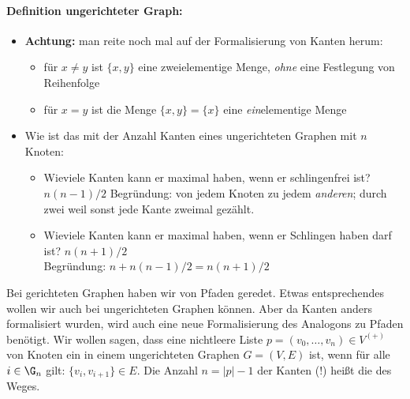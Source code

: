 \begin{tutorium} 
  \paragraph{Definition ungerichteter Graph:}
  \begin{itemize}
  \item \textbf{Achtung:} man reite noch mal auf der Formalisierung
von Kanten herum:
    \begin{itemize}
    \item für $x\not=y$ ist $\{x,y\}$ eine zweielementige Menge,
\emph{ohne} eine Festlegung von Reihenfolge
    \item für $x=y$ ist die Menge $\{x,y\}=\{x\}$ eine
\emph{ein}elementige Menge
    \end{itemize}
  \item Wie ist das mit der Anzahl Kanten eines ungerichteten Graphen
mit $n$ Knoten:
    \begin{itemize}
    \item Wieviele Kanten kann er maximal haben, wenn er schlingenfrei
ist? $n(n-1)/2$ Begründung: von jedem Knoten zu jedem \emph{anderen};
durch zwei weil sonst jede Kante zweimal gezählt.
    \item Wieviele Kanten kann er maximal haben, wenn er Schlingen
haben darf ist? $n(n+1)/2$ \\ Begründung: $n+n(n-1)/2 = n(n+1)/2$
    \end{itemize}
  \end{itemize}
\end{tutorium}

Bei gerichteten Graphen haben wir von Pfaden geredet.
% 
Etwas entsprechendes wollen wir auch bei ungerichteten Graphen können.
% 
Aber da Kanten anders formalisiert wurden, wird auch eine neue
Formalisierung des Analogons zu Pfaden benötigt.
% 
Wir wollen sagen, dass eine nichtleere Liste $p=(v_0,\dots, v_n)\in
V^{(+)}$ von Knoten ein  in einem
ungerichteten Graphen $G=(V,E)$ ist, wenn für alle $i\in \G_n$ gilt:
$\{v_i,v_{i+1}\}\in E$.
% 
Die Anzahl $n=|p| -1$ der Kanten (!) heißt die  des Weges.


